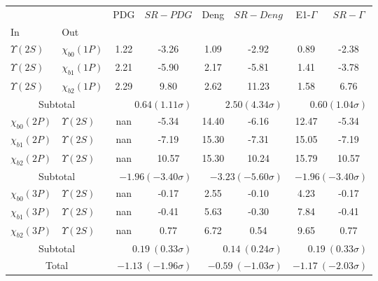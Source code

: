 \begin{tabular}{|l|l|c|c|c|c|c|c|}%
\hline%
&&PDG&$SR-PDG$&Deng&$SR-Deng$&E1-$\Gamma$&$SR-\Gamma$\\%
In&Out&&&&&&\\%
\hline%
$\Upsilon(2S)$&$\chi_{b0}(1P)$&1.22&-3.26&1.09&-2.92&0.89&-2.38\\%
$\Upsilon(2S)$&$\chi_{b1}(1P)$&2.21&-5.90&2.17&-5.81&1.41&-3.78\\%
$\Upsilon(2S)$&$\chi_{b2}(1P)$&2.29&9.80&2.62&11.23&1.58&6.76\\%
\hline%
\hline%
\multicolumn{2}{|c|}{Subtotal}&\multicolumn{2}{|r|}{$0.64 (1.11\sigma)$}&\multicolumn{2}{|r|}{$2.50 (4.34\sigma)$}&\multicolumn{2}{|r|}{$0.60 (1.04\sigma)$}\\%
\hline%
\hline%
$\chi_{b0}(2P)$&$\Upsilon(2S)$&nan&-5.34&14.40&-6.16&12.47&-5.34\\%
$\chi_{b1}(2P)$&$\Upsilon(2S)$&nan&-7.19&15.30&-7.31&15.05&-7.19\\%
$\chi_{b2}(2P)$&$\Upsilon(2S)$&nan&10.57&15.30&10.24&15.79&10.57\\%
\hline%
\hline%
\multicolumn{2}{|c|}{Subtotal}&\multicolumn{2}{|r|}{$-1.96 (-3.40\sigma)$}&\multicolumn{2}{|r|}{$-3.23 (-5.60\sigma)$}&\multicolumn{2}{|r|}{$-1.96 (-3.40\sigma)$}\\%
\hline%
\hline%
$\chi_{b0}(3P)$&$\Upsilon(2S)$&nan&-0.17&2.55&-0.10&4.23&-0.17\\%
$\chi_{b1}(3P)$&$\Upsilon(2S)$&nan&-0.41&5.63&-0.30&7.84&-0.41\\%
$\chi_{b2}(3P)$&$\Upsilon(2S)$&nan&0.77&6.72&0.54&9.65&0.77\\%
\hline%
\hline%
\multicolumn{2}{|c|}{Subtotal}&\multicolumn{2}{|r|}{$0.19~(0.33\sigma)$}&\multicolumn{2}{|r|}{$0.14~(0.24\sigma)$}&\multicolumn{2}{|r|}{$0.19~(0.33\sigma)$}\\%
\hline%
\hline%
\multicolumn{2}{|c|}{Total}&\multicolumn{2}{|r|}{$-1.13~(-1.96\sigma)$}&\multicolumn{2}{|r|}{$-0.59~(-1.03\sigma)$}&\multicolumn{2}{|r|}{$-1.17~(-2.03\sigma)$}\\%
\hline%
\end{tabular}